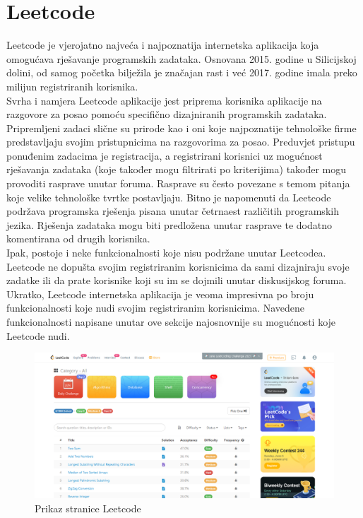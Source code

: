 \documentclass[times, utf8, zavrsni]{fer}
\begin{document}
		\section{Leetcode}
		Leetcode je vjerojatno najveća i najpoznatija internetska aplikacija koja omogućava rješavanje programskih zadataka. Osnovana 2015. godine u Silicijskoj dolini, od samog početka bilježila je značajan rast i već 2017. godine imala preko milijun registriranih korisnika.\\
		Svrha i namjera Leetcode aplikacije jest priprema korisnika aplikacije na razgovore za posao pomoću specifično dizajniranih programskih zadataka. Pripremljeni zadaci slične su prirode kao i oni koje najpoznatije tehnološke firme predstavljaju svojim pristupnicima na razgovorima za posao. Preduvjet pristupu ponuđenim zadacima je registracija, a registrirani korisnici uz mogućnost rješavanja zadataka (koje također mogu filtrirati po kriterijima) također mogu provoditi rasprave unutar foruma. Rasprave su često povezane s temom pitanja koje velike tehnološke tvrtke postavljaju. Bitno je napomenuti da Leetcode podržava programska rješenja pisana unutar četrnaest različitih programskih jezika. Rješenja zadataka mogu biti predložena unutar rasprave te dodatno komentirana od drugih korisnika.\\
		Ipak, postoje i neke funkcionalnosti koje nisu podržane unutar Leetcodea. Leetcode ne dopušta svojim registriranim korisnicima da sami dizajniraju svoje zadatke ili da prate korisnike koji su im se dojmili unutar diskusijskog foruma.\\
		Ukratko, Leetcode internetska aplikacija je veoma impresivna po broju funkcionalnosti koje nudi svojim registriranim korisnicima. Navedene funkcionalnosti napisane unutar ove sekcije najosnovnije su mogućnosti koje Leetcode nudi.
		\begin{figure}[H]
			\centering
			\includegraphics[width=\linewidth]{pictures/prikazi/Leetcode.png}
			\caption{Prikaz stranice Leetcode}
			\label{fig:leetcode}
		\end{figure}
	
\end{document}
